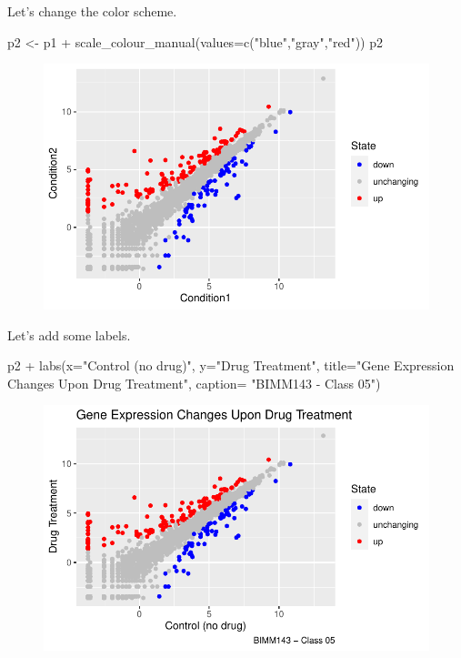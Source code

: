 \documentclass[
  letterpaper,
  DIV=11,
  numbers=noendperiod]{scrartcl}
\newenvironment{Shaded}{\begin{snugshade}}{\end{snugshade}}
\newcommand{\AttributeTok}[1]{\textcolor[rgb]{0.40,0.45,0.13}{#1}}
\newcommand{\FunctionTok}[1]{\textcolor[rgb]{0.28,0.35,0.67}{#1}}
\newcommand{\NormalTok}[1]{\textcolor[rgb]{0.00,0.23,0.31}{#1}}
\newcommand{\OtherTok}[1]{\textcolor[rgb]{0.00,0.23,0.31}{#1}}
\newcommand{\SpecialCharTok}[1]{\textcolor[rgb]{0.37,0.37,0.37}{#1}}
\newcommand{\StringTok}[1]{\textcolor[rgb]{0.13,0.47,0.30}{#1}}
\begin{document}
Let's change the color scheme.

\begin{Shaded}
\begin{Highlighting}[]
\NormalTok{p2 }\OtherTok{\textless{}{-}}\NormalTok{ p1 }\SpecialCharTok{+} \FunctionTok{scale\_colour\_manual}\NormalTok{(}\AttributeTok{values=}\FunctionTok{c}\NormalTok{(}\StringTok{"blue"}\NormalTok{,}\StringTok{"gray"}\NormalTok{,}\StringTok{"red"}\NormalTok{))}
\NormalTok{p2}
\end{Highlighting}
\end{Shaded}

\begin{figure}[H]

{\centering \includegraphics{class05_labreport_files/figure-pdf/unnamed-chunk-12-1.pdf}

}

\end{figure}

Let's add some labels.

\begin{Shaded}
\begin{Highlighting}[]
\NormalTok{p2 }\SpecialCharTok{+} \FunctionTok{labs}\NormalTok{(}\AttributeTok{x=}\StringTok{"Control (no drug)"}\NormalTok{, }
          \AttributeTok{y=}\StringTok{"Drug Treatment"}\NormalTok{,}
          \AttributeTok{title=}\StringTok{"Gene Expression Changes Upon Drug Treatment"}\NormalTok{, }
          \AttributeTok{caption=} \StringTok{"BIMM143 {-} Class 05"}\NormalTok{)}
\end{Highlighting}
\end{Shaded}

\begin{figure}[H]

{\centering \includegraphics{class05_labreport_files/figure-pdf/unnamed-chunk-13-1.pdf}

}

\end{figure}
\end{document}
